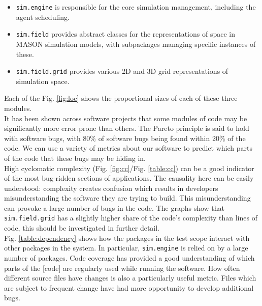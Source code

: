 \documentclass[11pt]{article}
\begin{document}
\begin{itemize}
\item \texttt{sim.engine} is responsible for the core simulation management, including the agent scheduling.
\item \texttt{sim.field} provides abstract classes for the representations of space in MASON simulation models, with subpackages managing specific instances of these.
\item \texttt{sim.field.grid} provides various 2D and 3D grid representations of simulation space.
\end{itemize}

Each of the Fig. \ref{fig:loc} shows the proportional sizes of each of these three modules.
\\

It has been shown across software projects that some modules of code may be significantly more error prone than others.
The Pareto principle is said to hold with software bugs, with 80\% of software bugs being found within 20\% of the code\cite[pp. 124]{pressman}.
We can use a variety of metrics about our software to predict which parts of the code that these bugs may be hiding in\cite{predicting_from_history}.
\\

High cyclomatic complexity (Fig. \ref{fig:cc}/Fig. \ref{table:cc}) can be a good indicator of the most bug-ridden sections of applications.
The causality here can be easily understood: complexity creates confusion which results in developers misunderstanding the software they are trying to build.
This misunderstanding can provoke a large number of bugs in the code.
The graphs show that \texttt{sim.field.grid} has a slightly higher share of the code's complexity than lines of code, this should be investigated in further detail.
\\

Fig. \ref{table:dependency} shows how the packages in the test scope interact with other packages in the system. In particular, \texttt{sim.engine} is relied on by a large number of packages.
Code coverage has provided a good understanding of which parts of the [code] are regularly used while running the software.
How often different source files have changes is also a particularly useful metric. Files which are subject to frequent change have had more opportunity to develop additional bugs.
\\
\end{document}
